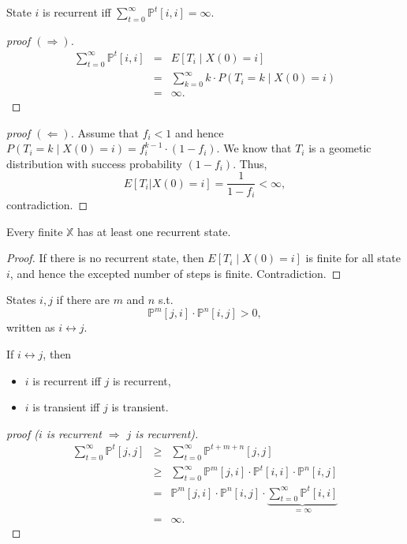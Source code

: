 \begin{lemma}
State $ i $ is recurrent iff $ \sum_{t = 0}^{\infty} \mathbb{P}^{t}[i, i] = \infty $.
\begin{proof}[proof $ (\Rightarrow) $]
\begin{eqnarray*}
\sum_{t = 0}^{\infty} \mathbb{P}^{t}[i, i]
  & = & E[T_{i} \mid X(0) = i] \\
  & = & \sum_{k = 0}^{\infty} k \cdot P(T_{i} = k \mid X(0) = i) \\
  & = & \infty.
\end{eqnarray*}
\end{proof}

\begin{proof}[proof $ (\Leftarrow) $]
Assume that $ f_{i} < 1 $ and hence $ P(T_{i} = k \mid X(0) = i) = f_{i}^{k - 1} \cdot (1 - f_{i}) $. We know that $ T_{i} $ is a geometic distribution with success probability $ (1 - f_{i}) $. Thus,
\[ E[T_{i} | X(0) = i] = \frac{1}{1 - f_{i}} < \infty, \]
contradiction.
\end{proof}
\end{lemma}

\begin{corollary} \label{cor:finite-X-has-recurrent-state}
Every finite $ \mathbb{X} $ has at least one recurrent state.
\begin{proof}
If there is no recurrent state, then $ E[T_{i} \mid X(0) = i] $ is finite for all state $ i $, and hence the excepted number of steps is finite. Contradiction.
\end{proof}
\end{corollary}

\begin{definition}
States $ i, j $  if there are $ m $ and $ n $ s.t.
\[ \mathbb{P}^{m}[j, i] \cdot \mathbb{P}^{n}[i, j] > 0, \]
written as $ i \leftrightarrow j $.
\end{definition}

\begin{lemma} \label{lem:communicate}
If $ i \leftrightarrow j $, then
\begin{itemize}
  \item $ i $ is recurrent iff $ j $ is recurrent,
  \item $ i $ is transient iff $ j $ is transient.
\end{itemize}
\begin{proof}[proof ($ i $ is recurrent $ \Rightarrow $ $ j $ is recurrent)]
\begin{eqnarray*}
\sum_{t = 0}^{\infty} \mathbb{P}^{t}[j, j]
  & \ge & \sum_{t = 0}^{\infty} \mathbb{P}^{t + m + n}[j, j] \\
  & \ge & \sum_{t = 0}^{\infty} \mathbb{P}^{m}[j, i] \cdot \mathbb{P}^{t}[i, i] \cdot \mathbb{P}^{n}[i, j] \\
  & = & \mathbb{P}^{m}[j, i] \cdot \mathbb{P}^{n}[i, j] \cdot \underbrace{\sum_{t = 0}^{\infty} \mathbb{P}^{t}[i, i]}_{= \infty} \\
  & = & \infty.
\end{eqnarray*}
\end{proof}
\end{lemma}

